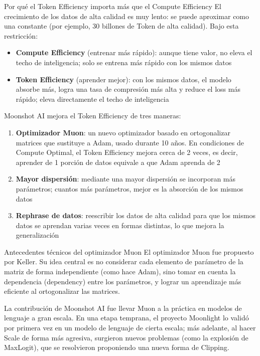 \documentclass[a4paper]{article}
\begin{document}
\begin{importantbox}{Por qué el Token Efficiency importa más que el Compute Efficiency}
El crecimiento de los datos de alta calidad es muy lento: se puede aproximar como una constante (por ejemplo, 30 billones de Token de alta calidad). Bajo esta restricción:
\begin{itemize}
    \item \textbf{Compute Efficiency} (entrenar más rápido): aunque tiene valor, no eleva el techo de inteligencia; solo se entrena más rápido con los mismos datos
    \item \textbf{Token Efficiency} (aprender mejor): con los mismos datos, el modelo absorbe más, logra una tasa de compresión más alta y reduce el loss más rápido; eleva directamente el techo de inteligencia
\end{itemize}
\end{importantbox}

Moonshot AI mejora el Token Efficiency de tres maneras:

\begin{enumerate}
    \item \textbf{Optimizador Muon}: un nuevo optimizador basado en ortogonalizar matrices que sustituye a Adam, usado durante 10 años. En condiciones de Compute Optimal, el Token Efficiency mejora cerca de 2 veces, es decir, aprender de 1 porción de datos equivale a que Adam aprenda de 2
    \item \textbf{Mayor dispersión}: mediante una mayor dispersión se incorporan más parámetros; cuantos más parámetros, mejor es la absorción de los mismos datos
    \item \textbf{Rephrase de datos}: reescribir los datos de alta calidad para que los mismos datos se aprendan varias veces en formas distintas, lo que mejora la generalización
\end{enumerate}

\begin{knowledgebox}{Antecedentes técnicos del optimizador Muon}
El optimizador Muon fue propuesto por Keller. Su idea central es no considerar cada elemento de parámetro de la matriz de forma independiente (como hace Adam), sino tomar en cuenta la dependencia (dependency) entre los parámetros, y lograr un aprendizaje más eficiente al ortogonalizar las matrices.

La contribución de Moonshot AI fue llevar Muon a la práctica en modelos de lenguaje a gran escala. En una etapa temprana, el proyecto Moonlight lo validó por primera vez en un modelo de lenguaje de cierta escala; más adelante, al hacer Scale de forma más agresiva, surgieron nuevos problemas (como la explosión de MaxLogit), que se resolvieron proponiendo una nueva forma de Clipping.
\end{knowledgebox}
\end{document}
